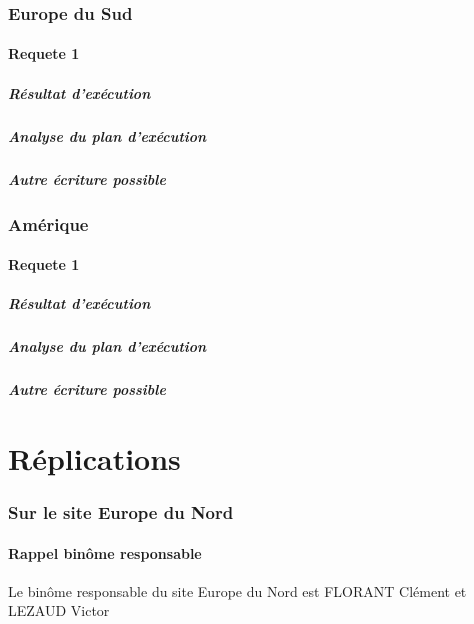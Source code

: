 \documentclass[10pt,a4paper,twoside]{article}
\begin{document}
\section{Europe du Sud}
\subsection{Requete 1}
\subsubsection{Résultat d'exécution}
\subsubsection{Analyse du plan d'exécution}
\subsubsection{Autre écriture possible}
\section{Amérique}
\subsection{Requete 1}
\subsubsection{Résultat d'exécution}
\subsubsection{Analyse du plan d'exécution}
\subsubsection{Autre écriture possible}

\newpage
\part{Réplications}
\section{Sur le site Europe du Nord}
\subsection{Rappel binôme responsable}
Le binôme responsable du site Europe du Nord est FLORANT Clément et LEZAUD Victor
\end{document}
